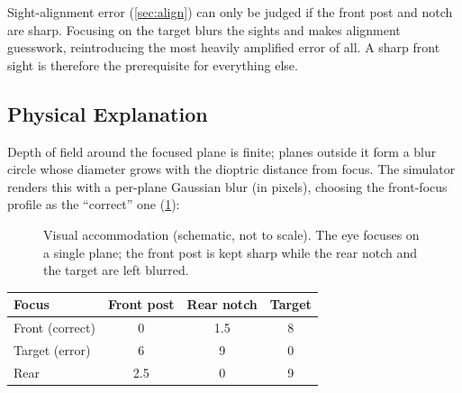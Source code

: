 \documentclass[11pt]{article}
\begin{document}
Sight-alignment error (\cref{sec:align}) can only be judged if the front
post and notch are sharp.  Focusing on the target blurs the sights and
makes alignment guesswork, reintroducing the most heavily amplified error
of all.  A sharp front sight is therefore the prerequisite for everything
else.

\subsection{Physical Explanation}

Depth of field around the focused plane is finite; planes outside it form
a blur circle whose diameter grows with the dioptric distance from focus.
The simulator renders this with a per-plane Gaussian blur (in pixels),
choosing the front-focus profile as the ``correct'' one (\cref{fig:focusfig}):

\begin{figure}[H]
\centering
{}
\caption{Visual accommodation (schematic, not to scale). The eye focuses on a
single plane; the front post is kept sharp while the rear notch and the target
are left blurred.}
\label{fig:focusfig}
\end{figure}

\begin{center}
\begin{tabular}{lccc}
\toprule
\textbf{Focus} & \textbf{Front post} & \textbf{Rear notch} & \textbf{Target}\\
\midrule
Front (correct)   & 0   & 1.5 & 8\\
Target (error)    & 6   & 9   & 0\\
Rear              & 2.5 & 0   & 9\\
\bottomrule
\end{tabular}
\end{center}
\end{document}
